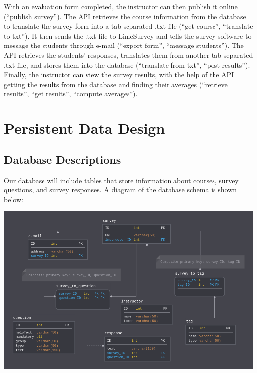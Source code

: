 \documentclass{article}
\begin{document}
With an evaluation form completed, the instructor can then publish it online (``publish survey''). The API retrieves the course information from the database to translate the survey form into a tab-separated .txt file (``get course'', ``translate to txt''). It then sends the .txt file to LimeSurvey and tells the survey software to message the students through e-mail (``export form'', ``message students''). The API retrieves the students' responses, translates them from another tab-separated .txt file, and stores them into the database (``translate from txt'', ``post results''). Finally, the instructor can view the survey results, with the help of the API getting the results from the database and finding their averages (``retrieve results'', ``get results'', ``compute averages'').

\section{Persistent Data Design}
\subsection{Database Descriptions}

Our database will include tables that store information about courses, survey questions, and survey responses. A diagram of the database schema is shown below:

\begin{center}
\label{fig:schemadiagram}
{\includegraphics[scale=.5]{images/schema_diagram.png}} 
\end{center}
\end{document}
